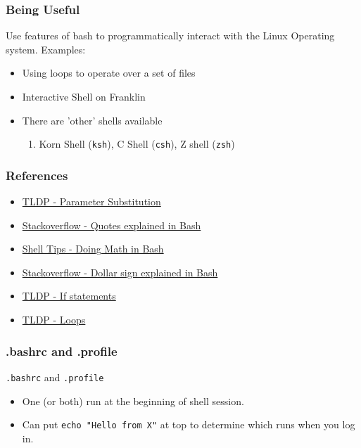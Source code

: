 \documentclass{beamer}
\newcommand{\code}[1]{\colorbox{codegray}{\texttt{#1}}}
\begin{document}
\begin{frame}
\frametitle{Being Useful}
Use features of bash to programmatically interact with the Linux Operating system. Examples:
\begin{itemize}
    \item Using loops to operate over a set of files
    \pause
    \item Interactive Shell on Franklin
    \pause
    \item There are 'other' shells available
    \begin{enumerate}
        \item Korn Shell (\code{ksh}), C Shell (\code{csh}), Z shell (\code{zsh})
    \end{enumerate}
\end{itemize}
\end{frame}



\begin{frame}
\frametitle{References}
\begin{itemize}
    \item \href{https://tldp.org/LDP/abs/html/parameter-substitution.html}{TLDP - Parameter Substitution}
    \bigskip
    \item \href{https://stackoverflow.com/questions/6697753/difference-between-single-and-double-quotes-in-bash}{Stackoverflow - Quotes explained in Bash }
    \bigskip
    \item \href{https://www.shell-tips.com/bash/math-arithmetic-calculation/}{Shell Tips - Doing Math in Bash}
    \bigskip
    \item \href{https://stackoverflow.com/a/5163260/4021436}{Stackoverflow - Dollar sign explained in Bash }
    \bigskip
    \item \href{https://tldp.org/LDP/Bash-Beginners-Guide/html/sect_07_01.html}{TLDP - If statements}
    \bigskip
    \item \href{https://tldp.org/LDP/abs/html/loops1.html}{TLDP - Loops }
\end{itemize}
\end{frame}






\begin{frame}
\frametitle{.bashrc and .profile}
\code{.bashrc} and \code{.profile}
\bigskip
\begin{itemize}
    \item One (or both) run at the beginning of shell session.
    \bigskip
    \pause
    \item Can put \code{echo "Hello from X"} at top to determine which runs when you log in.
\end{itemize}
\end{frame}
\end{document}
